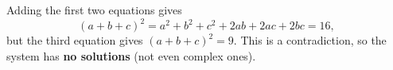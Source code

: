 Adding the first two equations gives
\[(a+b+c)^2=a^2+b^2+c^2+2ab+2ac+2bc=16,\]
but the third equation gives $(a+b+c)^2=9$. This is a contradiction, so the system has \textbf{no solutions} (not even complex ones).
